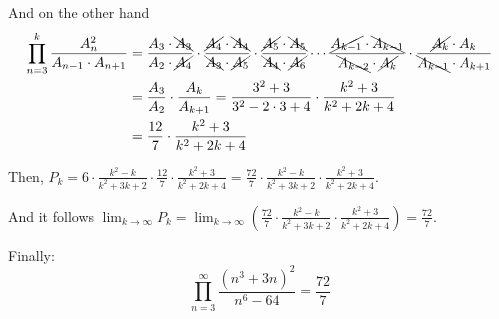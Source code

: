 \documentclass[../../main.tex]{subfiles}
\begin{document}
  And on the other hand
  \begin{equation*}
    \begin{split}
      \prod_{n = 3}^k \frac{A_n^2}{A_{n - 1} \cdot A_{n + 1}} & =
      \frac{A_3 \cdot \bcancel{A_3}}{A_2 \cdot \cancel{A_4}} \cdot \frac{\cancel{A_4} \cdot \bcancel{A_4}}{\bcancel{A_3} \cdot\cancel{A_5}} \cdot \frac{\cancel{A_5} \cdot \bcancel{A_5}}{\bcancel{A_4} \cdot \cancel{A_6}} \cdots \frac{\cancel{A_{k - 1}} \cdot \bcancel{A_{k - 1}}}{\bcancel{A_{k - 2}} \cdot \cancel{A_k}} \cdot \frac{\cancel{A_k} \cdot A_k}{\bcancel{A_{k - 1}} \cdot A_{k + 1}} \\ & =
      \frac{A_3}{A_2} \cdot \frac{A_k}{A_{k + 1}} = \frac{3^2 + 3}{3^2 - 2 \cdot 3 + 4} \cdot \frac{k^2 + 3}{k^2 + 2k + 4} \\ & =
      \frac{12}{7} \cdot \frac{k^2 + 3}{k^2 + 2k + 4}
    \end{split}
  \end{equation*}

  Then, $P_k = 6 \cdot \displaystyle\frac{k^2 - k}{k^2 + 3k + 2} \cdot \displaystyle\frac{12}{7} \cdot \displaystyle\frac{k^2 + 3}{k^2 + 2k + 4} = \displaystyle\frac{72}{7} \cdot \displaystyle\frac{k^2 - k}{k^2 + 3k + 2} \cdot \displaystyle\frac{k^2 + 3}{k^2 + 2k + 4}$.

  And it follows $\displaystyle\lim_{k \to \infty} P_k = \displaystyle\lim_{k \to \infty} \left(\displaystyle\frac{72}{7} \cdot \displaystyle\frac{k^2 - k}{k^2 + 3k + 2} \cdot \displaystyle\frac{k^2 + 3}{k^2 + 2k + 4}\right) = \displaystyle\frac{72}{7}$.

  Finally:
  $$
  \prod_{n = 3}^\infty \frac{(n^3 + 3n)^2}{n^6 - 64} = \frac{72}{7}
  $$
\end{document}
